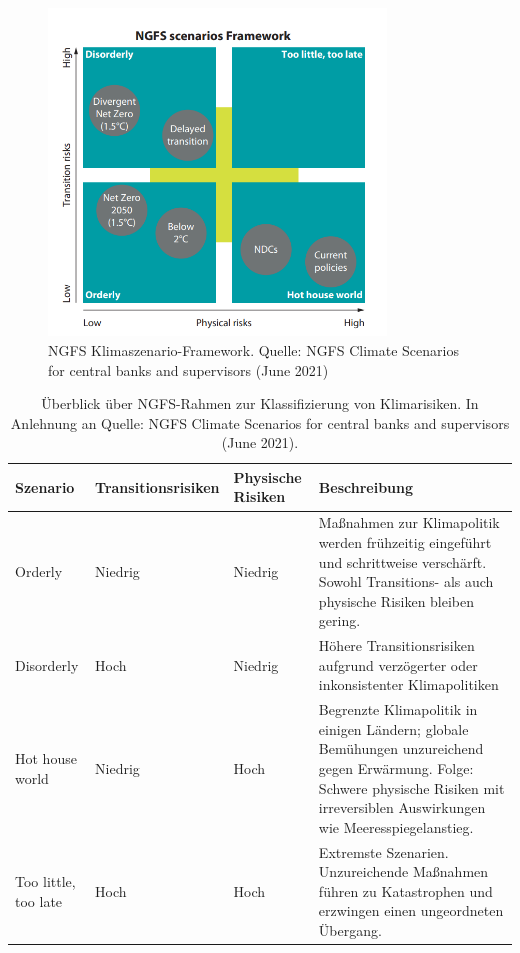 \begin{figure}[htbp]
    \centering
    \includegraphics[width=0.8\textwidth]{figures/NGFS.png}
    \caption{NGFS Klimaszenario-Framework. Quelle: NGFS Climate Scenarios for central banks and supervisors (June 2021)}
    \label{fig:ngfs}
\end{figure}
\FloatBarrier

\begin{table}[htbp]
    \centering
    \small
    \caption{Überblick über NGFS-Rahmen zur Klassifizierung von Klimarisiken. In Anlehnung an Quelle: NGFS Climate Scenarios for central banks and supervisors (June 2021).}
    \label{tab:ngfs-framework}
    \begin{tabularx}{1.0\textwidth}{>{\raggedright\arraybackslash}X >{\centering\arraybackslash}X >{\centering\arraybackslash}X >{\raggedright\arraybackslash}X}
        \toprule
        \textbf{Szenario} & \textbf{Transitionsrisiken} & \textbf{Physische Risiken} & \textbf{Beschreibung} \\
        \midrule
        Orderly & Niedrig & Niedrig & Maßnahmen zur Klimapolitik werden frühzeitig eingeführt und schrittweise verschärft. Sowohl Transitions- als auch physische Risiken bleiben gering. \\
        \addlinespace
        Disorderly & Hoch & Niedrig & Höhere Transitionsrisiken aufgrund verzögerter oder inkonsistenter Klimapolitiken \\
        \addlinespace
        Hot house world & Niedrig & Hoch & Begrenzte Klimapolitik in einigen Ländern; globale Bemühungen unzureichend gegen Erwärmung. Folge: Schwere physische Risiken mit irreversiblen Auswirkungen wie Meeresspiegelanstieg.\\
        \addlinespace
        Too little, too late & Hoch & Hoch & Extremste Szenarien. Unzureichende Maßnahmen führen zu Katastrophen und erzwingen einen ungeordneten Übergang. \\
        \bottomrule
    \end{tabularx}
\end{table}
\FloatBarrier

